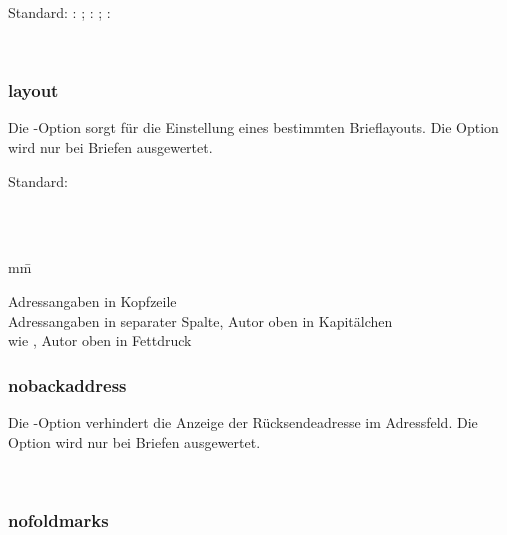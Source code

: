 Standard: : ; : ; : 

\begin{nutzung}
		\>\\
	\beispiel
		\>
\end{nutzung}


\subsubsection{layout}

Die -Option sorgt für die Einstellung eines bestimmten Brieflayouts.
Die Option wird nur bei Briefen ausgewertet.

Standard: 

\begin{nutzung}
		\>\\
	\beispiel
		\>\\
		\>
\end{nutzung}

\begin{tabbing}
	mm\=\kill

	\>Adressangaben in Kopfzeile\\
	\>Adressangaben in separater Spalte, Autor oben in Kapitälchen\\
	\>wie , Autor oben in Fettdruck
\end{tabbing}

\subsubsection{nobackaddress}

Die -Option verhindert die Anzeige der Rücksendeadresse im Adressfeld.
Die Option wird nur bei Briefen ausgewertet.

\begin{nutzung}
		\>\\
\end{nutzung}

\subsubsection{nofoldmarks}

